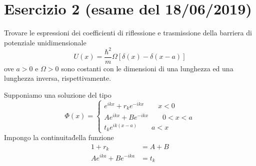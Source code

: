 \documentclass[a4paper]{article}
\begin{document}
    \section*{Esercizio 2 (esame del 18/06/2019)}
        Trovare le espressioni dei coefficienti di riflessione e trasmissione della barriera di potenziale unidimensionale
        \begin{equation*}
            U(x)=\frac{\hbar^2}{m}\Omega\left[\delta(x)-\delta(x-a)\right]
        \end{equation*}
        ove $a > 0$ e $\Omega > 0$ sono costanti con le dimensioni di una lunghezza ed una lunghezza inversa, rispettivamente.
        \begin{figure}[H]
            \centering
        \end{figure}
        Supponiamo una soluzione del tipo
        \begin{equation*}
            \Phi(x)=
            \begin{cases}
                e^{ikx}+r_ke^{-ikx} \quad\quad x<0\\
                Ae^{ikx}+Be^{-ikx} \quad\quad 0<x<a\\
                t_ke^{ik(x-a)} \quad\quad a<x
            \end{cases}
        \end{equation*}
        Impongo la continuita\' della funzione
        \begin{equation*}
            \begin{split}
                1+r_k&=A+B\\
                Ae^{ika}+Be^{-ika}&=t_k
            \end{split}
        \end{equation*}
\end{document}
